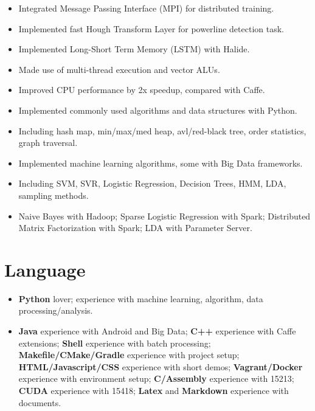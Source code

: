 \documentclass[letterpaper,11pt]{article}
\begin{document}
\begin{itemize}
  \begin{itemize}
  \item Integrated Message Passing Interface (MPI) for distributed training.
  \item Implemented fast Hough Transform Layer for powerline detection task.
  \end{itemize}
  \begin{itemize}
  \item Implemented Long-Short Term Memory (LSTM) with Halide.
  \item Made use of multi-thread execution and vector ALUs.
  \item Improved CPU performance by 2x speedup, compared with Caffe.
  \end{itemize}
  \begin{itemize}
  \item Implemented commonly used algorithms and data structures with Python.
  \item Including hash map, min/max/med heap, avl/red-black tree, order statistics, graph traversal.
  \end{itemize}
  \begin{itemize}
  \item Implemented machine learning algorithms, some with Big Data frameworks.
  \item Including SVM, SVR, Logistic Regression, Decision Trees, HMM, LDA, sampling methods.
  \item Naive Bayes with Hadoop; Sparse Logistic Regression with Spark; Distributed Matrix Factorization with Spark; LDA with Parameter Server.
  \end{itemize}
\end{itemize}

\section*{Language}
\begin{itemize}
\item \textbf{Python} lover; experience with machine learning, algorithm, data processing/analysis.
\item \textbf{Java} experience with Android and Big Data; \textbf{C++} experience with Caffe extensions; \textbf{Shell} experience with batch processing; \textbf{Makefile/CMake/Gradle} experience with project setup; \textbf{HTML/Javascript/CSS} experience with short demos; \textbf{Vagrant/Docker} experience with environment setup; \textbf{C/Assembly} experience with 15213; \textbf{CUDA} experience with 15418; \textbf{Latex} and \textbf{Markdown} experience with documents.
\end{itemize}
 
\end{document}
